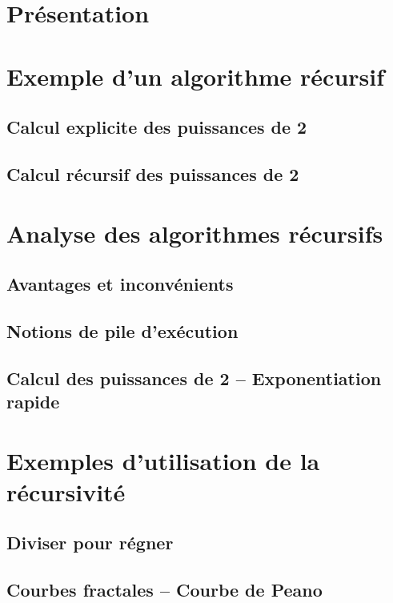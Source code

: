 \documentclass[10pt,fleqn]{article} %
\begin{document}


\section{Présentation}

\section{Exemple d'un algorithme récursif}
\subsection{Calcul explicite des puissances de 2}



\subsection{Calcul récursif des puissances de 2}

\section{Analyse des algorithmes récursifs}
\subsection{Avantages et inconvénients}

\subsection{Notions de pile d'exécution}

\subsection{Calcul des puissances de 2 -- Exponentiation rapide}
\section{Exemples d'utilisation de la récursivité}
\subsection{Diviser pour régner}

\subsection{Courbes fractales -- Courbe de Peano}


\begin{thebibliography}{2}
\end{thebibliography}
\end{document}
